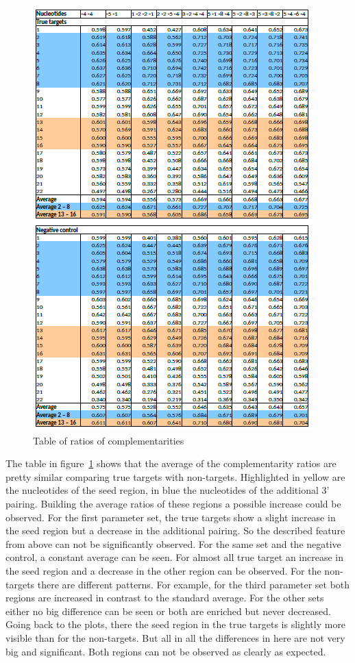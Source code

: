 \documentclass[12pt]{article}
\begin{document}
\begin{figure}
\centering
\includegraphics[scale=1.1]{results/ratio_table2.PNG}
\caption{Table of ratios of complementarities}
\label{table:ratios}
\end{figure}



The table in figure~\ref{table:ratios} shows that the average of the complementarity ratios are pretty similar comparing true targets with non-targets. Highlighted in yellow are the nucleotides of the seed region, in blue the nucleotides of the additional 3' pairing. Building the average ratios of these regions a possible increase could be observed. For the first parameter set, the true targets show a slight increase in the seed region but a decrease in the additional pairing. So the described feature from above can not be significantly observed. For the same set and the negative control, a constant average can be seen. For almost all true target an increase in the seed region and a decrease in the other region can be observed. For the non-targets there are different patterns. For example, for the third parameter set both regions are increased in contrast to the standard average. For the other sets either no big difference can be seen or both are enriched but never decreased. Going back to the plots, there the seed region in the true targets is slightly more visible than for the non-targets. But all in all the differences in here are not very big and significant. Both regions can not be observed as clearly as expected.  \\
\end{document}
